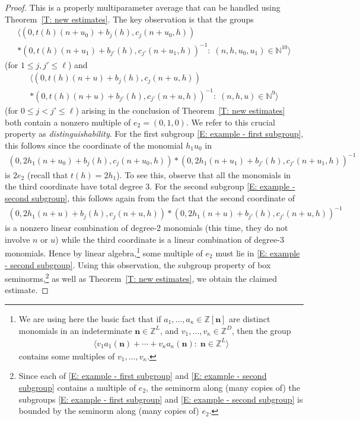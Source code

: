 \documentclass[11pt]{amsart}
\theoremstyle{definition}
\newcommand{\N}{{\mathbb N}}
\newcommand{\Z}{{\mathbb Z}}
\newcommand{\bn}{{\mathbf{n}}}
\newcommand{\inv}{^{-1}}
\newcommand{\1}{{\mathbf{1}}}
\begin{document}
\begin{proof}
    This is a properly multiparameter average that can be handled using Theorem~\ref{T: new estimates}. The key observation is that the groups
    \begin{multline}\label{E: example - first subgroup}
        \langle (0, t(h)(n+u_0) + b_j(h),c_j(n+u_0,h))\\ *(0, t(h)(n+u_1) + b_{j'}(h),c_{j'}(n+u_1,h))\inv\colon\;
        (n,h,u_0,u_1)\in\N^{10}\rangle 
    \end{multline}
    (for $1\leq j,j'\leq \ell$) and
    \begin{multline}\label{E: example - second subgroup}
        \langle (0, t(h)(n+u) + b_j(h),c_j(n+u,h))\\ * (0, t(h)(n+u) + b_{j'}(h),c_{j'}(n+u,h))\inv\colon\; (n,h,u)\in\N^9\rangle 
    \end{multline}
    (for $0\leq j<j'\leq \ell$) arising in the conclusion of Theorem~\ref{T: new estimates} both contain a nonzero multiple of $e_2 = (0,1,0)$. We refer to this crucial property as \textit{distinguishability}. 
    For the first subgroup \eqref{E: example - first subgroup}, this follows since the coordinate of the monomial $h_1u_0$ in 
    \begin{align*}
        (0, 2h_1(n+u_0) + b_j(h),c_j(n+u_0,h))* (0, 2h_1(n+u_1) + b_{j'}(h),c_{j'}(n+u_1,h))\inv
    \end{align*}
    is $2e_2$ (recall that $t(h) = 2h_1$). To see this, observe that all the monomials in the third coordinate  have total degree 3. 
    For the second subgroup \eqref{E: example - second subgroup}, this follows again from the fact that the second coordinate of 
    \begin{align*}
        (0, 2h_1(n+u) + b_j(h),c_j(n+u,h))* (0, 2h_1(n+u) + b_{j'}(h),c_{j'}(n+u,h))\inv
    \end{align*}
    is a nonzero linear combination of degree-2 monomials (this time, they do not involve $n$ or $u$) while the third coordinate is a linear combination of degree-3 monomials. Hence by linear algebra,\footnote{We are using here the basic fact that if $a_1, \ldots, a_\kappa\in\Z[\bn]$ are distinct monomials in an indeterminate $\bn\in \Z^L$, and $v_1, \ldots, v_\kappa\in\Z^D$, then the group
    \begin{align*}
        \langle v_1 a_1(\bn) + \cdots + v_\kappa a_\kappa(\bn)\colon\; \bn\in\Z^L\rangle
    \end{align*}
    contains some multiples of $v_1, \ldots, v_\kappa$.
    } some multiple of $e_2$ must lie in \eqref{E: example - second subgroup}. Using this observation, the subgroup property of box seminorms,\footnote{Since each of \eqref{E: example - first subgroup} and \eqref{E: example - second subgroup} contains a multiple of $e_2$, the seminorm along (many copies of) the subgroups \eqref{E: example - first subgroup} and \eqref{E: example - second subgroup} is bounded by the seminorm along (many copies of) $e_2$.} as well as Theorem~\ref{T: new estimates}, we obtain the claimed estimate.
\end{proof}
\end{document}
